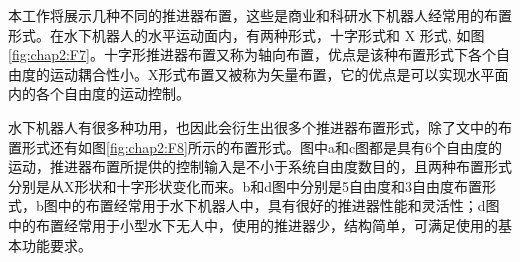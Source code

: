 本工作将展示几种不同的推进器布置，这些是商业和科研水下机器人经常用的布置形式。在水下机器人的水平运动面内，有两种形式，十字形式和 X 形式, 如图\ref{fig:chap2:F7}\cite{dos2016bank}。十字形推进器布置又称为轴向布置，优点是该种布置形式下各个自由度的运动耦合性小。X形式布置又被称为矢量布置，它的优点是可以实现水平面内的各个自由度的运动控制。

水下机器人有很多种功用，也因此会衍生出很多个推进器布置形式，除了文中的布置形式还有如图\ref{fig:chap2:F8}所示的布置形式\cite{ardusub}。图中a和c图都是具有6个自由度的运动，推进器布置所提供的控制输入是不小于系统自由度数目的，且两种布置形式分别是从X形状和十字形状变化而来。b和d图中分别是5自由度和3自由度布置形式，b图中的布置经常用于水下机器人中，具有很好的推进器性能和灵活性；d图中的布置经常用于小型水下无人中，使用的推进器少，结构简单，可满足使用的基本功能要求。

